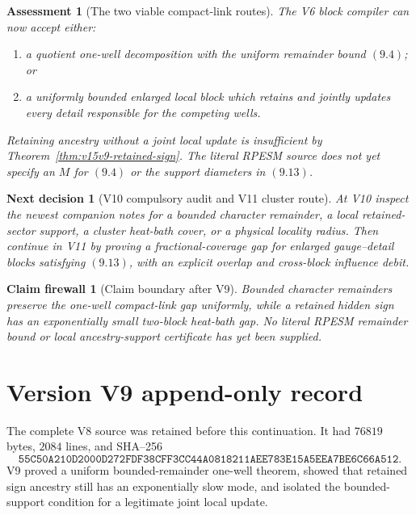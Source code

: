 \documentclass[11pt]{article}
\newtheorem{firewall}[theorem]{Claim firewall}
\newtheorem{decision}[theorem]{Next decision}
\newtheorem{assessment}[theorem]{Assessment}
\theoremstyle{remark}
\begin{document}
\begin{assessment}[The two viable compact-link routes]
\label{ass:v15v9-routes}
The V6 block compiler can now accept either:
\begin{enumerate}
\item a quotient one-well decomposition with the uniform remainder
      bound \((9.4)\); or
\item a uniformly bounded enlarged local block which retains and
      jointly updates every detail responsible for the competing
      wells.
\end{enumerate}
Retaining ancestry without a joint local update is insufficient by
Theorem~\ref{thm:v15v9-retained-sign}.  The literal RPESM source
does not yet specify an \(M\) for \((9.4)\) or the support
diameters in \((9.13)\).
\end{assessment}

\begin{decision}[V10 compulsory audit and V11 cluster route]
\label{dec:v15v9-next}
At V10 inspect the newest companion notes for a bounded character
remainder, a local retained-sector support, a cluster heat-bath
cover, or a physical locality radius.  Then continue in V11 by
proving a fractional-coverage gap for enlarged gauge--detail
blocks satisfying \((9.13)\), with an explicit overlap and
cross-block influence debit.
\end{decision}

\begin{firewall}[Claim boundary after V9]
\label{fire:v15v9}
Bounded character remainders preserve the one-well compact-link
gap uniformly, while a retained hidden sign has an exponentially
small two-block heat-bath gap.  No literal RPESM remainder bound
or local ancestry-support certificate has yet been supplied.
\end{firewall}

\section*{Version V9 append-only record}
The complete V8 source was retained before this continuation.  It
had \(76819\) bytes, \(2084\) lines, and SHA--256
\[
 \texttt{55C50A210D2000D272FDF38CFF3CC44A0818211AEE783E15A5EEA7BE6C66A512}.
\]
V9 proved a uniform bounded-remainder one-well theorem, showed
that retained sign ancestry still has an exponentially slow mode,
and isolated the bounded-support condition for a legitimate joint
local update.
\end{document}
